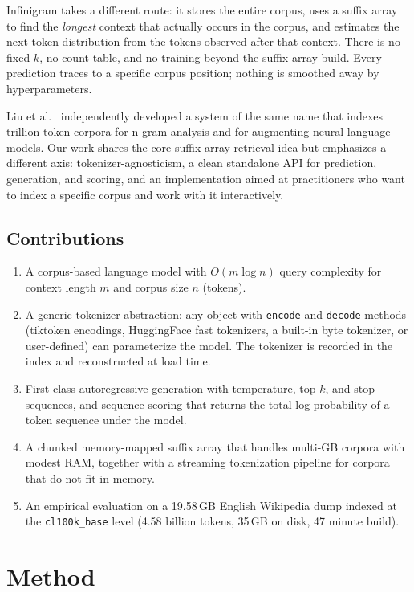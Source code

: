 \documentclass[11pt]{article}
\begin{document}
Infinigram takes a different route: it stores the entire corpus, uses a suffix array \citep{manber1993suffix} to find the \emph{longest} context that actually occurs in the corpus, and estimates the next-token distribution from the tokens observed after that context. There is no fixed $k$, no count table, and no training beyond the suffix array build. Every prediction traces to a specific corpus position; nothing is smoothed away by hyperparameters.

Liu et al.\ \citep{liu2024infini} independently developed a system of the same name that indexes trillion-token corpora for n-gram analysis and for augmenting neural language models. Our work shares the core suffix-array retrieval idea but emphasizes a different axis: tokenizer-agnosticism, a clean standalone API for prediction, generation, and scoring, and an implementation aimed at practitioners who want to index a specific corpus and work with it interactively.

\subsection{Contributions}

\begin{enumerate}
    \item A corpus-based language model with $O(m \log n)$ query complexity for context length $m$ and corpus size $n$ (tokens).
    \item A generic tokenizer abstraction: any object with \texttt{encode} and \texttt{decode} methods (tiktoken encodings, HuggingFace fast tokenizers, a built-in byte tokenizer, or user-defined) can parameterize the model. The tokenizer is recorded in the index and reconstructed at load time.
    \item First-class autoregressive generation with temperature, top-$k$, and stop sequences, and sequence scoring that returns the total log-probability of a token sequence under the model.
    \item A chunked memory-mapped suffix array that handles multi-GB corpora with modest RAM, together with a streaming tokenization pipeline for corpora that do not fit in memory.
    \item An empirical evaluation on a 19.58\,GB English Wikipedia dump indexed at the \texttt{cl100k\_base} level (4.58 billion tokens, 35\,GB on disk, 47 minute build).
\end{enumerate}

\section{Method}
\end{document}
